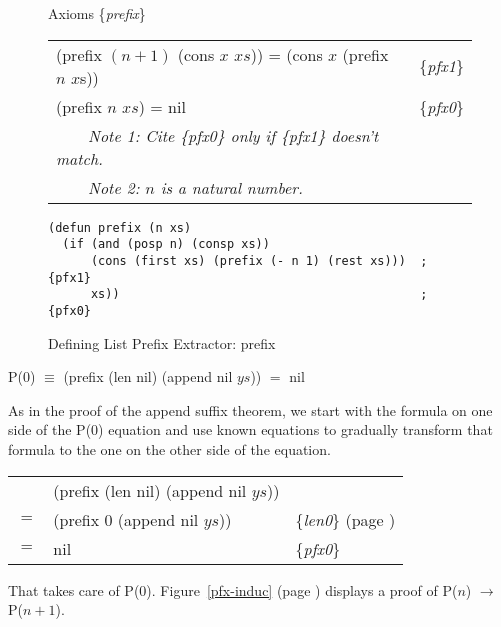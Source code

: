 \begin{figure}
\begin{center}
Axioms \{\emph{prefix}\}                                           \\
\begin{tabular}{ll}
(prefix $(n + 1)$ (cons $x$ $xs$)) = (cons $x$ (prefix $n$ $x$s)) & \{\emph{pfx1}\} \\
(prefix $n$ $xs$) =  nil                                          & \{\emph{pfx0}\} \\
~~~~\emph{Note 1: Cite \{\emph{pfx0}\} only if \{\emph{pfx1}\} doesn't match.}&\\
~~~~\emph{Note 2: $n$ is a natural number.}
\end{tabular}
\begin{Verbatim}
(defun prefix (n xs)
  (if (and (posp n) (consp xs))
      (cons (first xs) (prefix (- n 1) (rest xs)))  ; {pfx1}
      xs))                                          ; {pfx0}
\end{Verbatim}
\end{center}
\caption{Defining List Prefix Extractor: prefix}
\label{prefix-equations}
\end{figure}

\begin{center}
P($0$) $\equiv$ (prefix (len nil) (append nil $ys$)) $=$ nil
\end{center}

As in the proof of the append suffix theorem, we start
with the formula on one side of the P(0) equation
and use known equations to gradually transform
that formula to the one on the other side of the equation.

\begin{center}
\begin{tabular}{lll}
    & (prefix (len nil) (append nil $ys$))  &                                                  \\
$=$ & (prefix 0 (append nil $ys$))          & \{\emph{len0}\} (page \pageref{len-equations})   \\
$=$ & nil                                   & \{\emph{pfx0}\}                                  \\
\end{tabular}
\end{center}

That takes care of P(0). Figure~\ref{pfx-induc} (page \pageref{pfx-induc}) displays a proof of P($n$) $\rightarrow$ P($n+1$).

